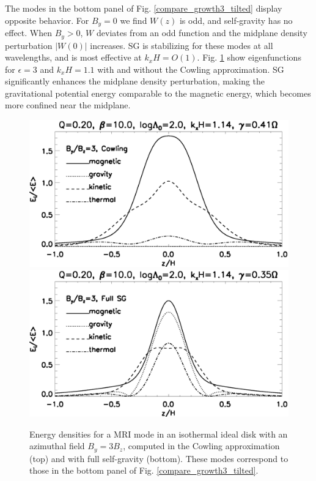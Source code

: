 The modes in the bottom panel of Fig. \ref{compare_growth3_tilted} 
display opposite behavior. For $B_y=0$ we find {\bf$W(z)$} is odd, and
self-gravity has no effect. When $B_y>0$, $W$ deviates from an
odd function and the midplane density perturbation $|W(0)|$
increases. SG is stabilizing for these modes at all wavelengths, and
is most effective at $k_xH =  O(1)$. 
Fig. \ref{result_tilted} show eigenfunctions for $\epsilon=3$ and
$k_xH=1.1$ with and without the Cowling approximation.
SG significantly enhances the midplane density perturbation, making the
gravitational potential energy comparable to the magnetic energy, 
which becomes more confined near the midplane.  

\begin{figure}
  \includegraphics[width=\linewidth,clip=true,trim=0cm 1.5cm 0cm
    0cm]{figures/result_tilted_cowling.ps}  
  \includegraphics[width=\linewidth,clip=true,trim=0cm 0cm 0cm
    0.cm]{figures/result_tilted_fullsg.ps} 
  \caption{Energy densities for a MRI mode in an isothermal ideal disk
    with an azimuthal field $B_y = 3B_z$, computed in the Cowling
    approximation (top) and with full self-gravity (bottom). These
    modes correspond to those in the bottom panel of
    Fig. \ref{compare_growth3_tilted}.    
    \label{result_tilted}}
\end{figure}


